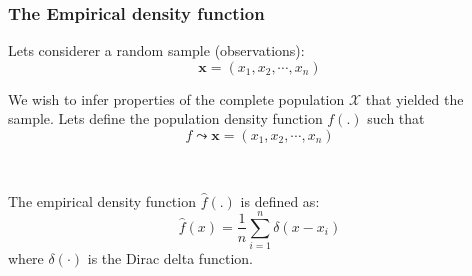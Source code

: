 \frame
{
\frametitle{The Empirical density function}

Lets considerer  a  random sample (observations):
$$\mathbf{x}=(x_1,x_2,\cdots,x_n)$$ 

We wish to infer properties of the complete population $\mathcal{X}$ that yielded the sample. Lets define  the population density function $f(.)$ such that 
$$
f \leadsto \mathbf{x}=(x_1,x_2,\cdots,x_n) $$


\

\begin{definition}
The \alert{empirical density function} $\hat{f}(.)$ is defined as:
$$
{\textstyle\hat{f}(x)=\frac{1}{n}\sum_{i=1}^{n} \delta(x-x_i)}
$$
where $\delta(\cdot)$ is the Dirac delta function.

\end{definition}
}

